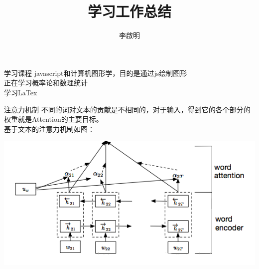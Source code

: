 \documentclass[serif]{beamer}
\title{\textbf{学习工作总结}}%
\author{李啟明}%
\begin{document}
\begin{frame}[plain]
	\maketitle
\end{frame}

\begin{frame}{学习课程}
    javascript和计算机图形学，目的是通过js绘制图形
    \\[2ex]
    正在学习概率论和数理统计
    \\[2ex]
    学习LaTex
    \\[2ex]
\end{frame}
\begin{frame}{注意力机制}
\qquad 不同的词对文本的贡献是不相同的，对于输入，得到它的各个部分的权重就是Attention的主要目标。
\\[2ex]
\qquad 基于文本的注意力机制如图：
\\[2ex]
	    \begin{center}
    	\includegraphics[scale=0.6]{attention.png}
    	\end{center}
    
\end{frame}
\end{document}

